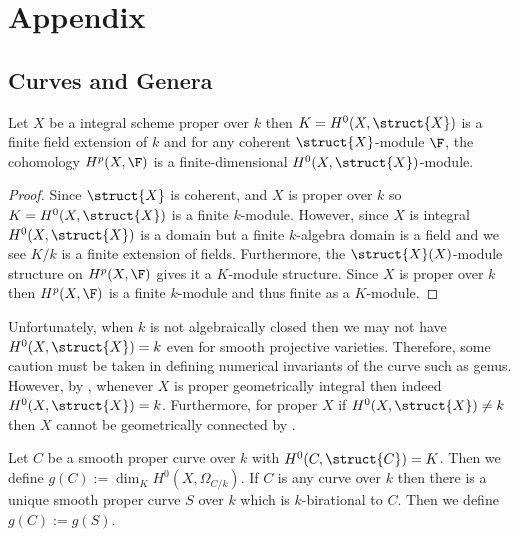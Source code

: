 \documentclass[12pt]{article}
\begin{document}
\section{Appendix}

\subsection{Curves and Genera}

\begin{lemma}
Let $X$ be a integral scheme proper over $k$ then $K = H^0(X, \struct{X})$ is a finite field extension of $k$ and for any coherent $\struct{X}$-module $\F$, the cohomology $H^p(X, \F)$ is a finite-dimensional $H^0(X, \struct{X})$-module.
\end{lemma}

\begin{proof}
Since $\struct{X}$ is coherent, and $X$ is proper over $k$ so $K = H^0(X, \struct{X})$ is a finite $k$-module. However, since $X$ is integral $H^0(X, \struct{X})$ is a domain but a finite $k$-algebra domain is a field and we see $K / k$ is a finite extension of fields. Furthermore, the $\struct{X}(X)$-module structure on $H^p(X, \F)$ gives it a $K$-module structure. Since $X$ is proper over $k$ then $H^p(X, \F)$ is a finite $k$-module and thus finite as a $K$-module.
\end{proof}

\begin{rmk}
Unfortunately, when $k$ is not algebraically closed then we may not have $H^0(X, \struct{X}) = k$ even for smooth projective varieties. Therefore, some caution must be taken in defining numerical invariants of the curve such as genus. However, by \cite[\href{https://stacks.math.columbia.edu/tag/0BUG}{Tag 0BUG}]{stacks-project}, whenever $X$ is proper geometrically integral then indeed $H^0(X, \struct{X}) = k$. Furthermore, for proper $X$ if $H^0(X, \struct{X}) \neq k$ then $X$ cannot be geometrically connected by \cite[\href{https://stacks.math.columbia.edu/tag/0FD1}{Tag 0FD1}]{stacks-project}.
\end{rmk}

\begin{defn}
Let $C$ be a smooth proper curve over $k$ with $H^0(C, \struct{C}) = K$. Then we define $g(C) := \dim_K H^0(X, \Omega_{C / k})$. If $C$ is any curve over $k$ then there is a unique smooth proper curve $S$ over $k$ which is $k$-birational to $C$. Then we define $g(C) := g(S)$. 
\end{defn}
\end{document}
